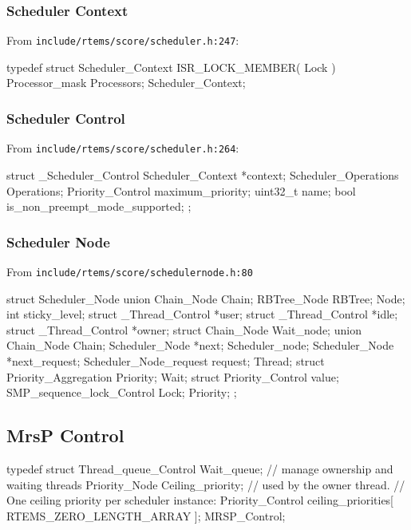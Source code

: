 \subsubsection{Scheduler Context}

From \texttt{include/rtems/score/scheduler.h:247}:
\begin{nicec}
typedef struct Scheduler_Context {
  ISR_LOCK_MEMBER( Lock )
  Processor_mask Processors;
} Scheduler_Context;
\end{nicec}

\subsubsection{Scheduler Control}

From \texttt{include/rtems/score/scheduler.h:264}:
\begin{nicec}
struct _Scheduler_Control {
  Scheduler_Context *context;
  Scheduler_Operations Operations;
  Priority_Control maximum_priority;
  uint32_t name;
  bool is_non_preempt_mode_supported;
};
\end{nicec}

\subsubsection{Scheduler Node}

From \texttt{include/rtems/score/schedulernode.h:80}
\begin{nicec}
struct Scheduler_Node {
  union {
    Chain_Node Chain;
    RBTree_Node RBTree;
  } Node;
  int sticky_level;
  struct _Thread_Control *user;
  struct _Thread_Control *idle;
  struct _Thread_Control *owner;
  struct {
    Chain_Node Wait_node;
    union {
      Chain_Node Chain;
      Scheduler_Node *next;
    } Scheduler_node;
    Scheduler_Node *next_request;
    Scheduler_Node_request request;
  } Thread;
  struct {
    Priority_Aggregation Priority;
  } Wait;
  struct {
    Priority_Control value;
    SMP_sequence_lock_Control Lock;
  } Priority;
};
\end{nicec}



\newpage
\subsection{MrsP Control}

\begin{nicec}
typedef struct {
  Thread_queue_Control Wait_queue; // manage ownership and waiting threads
  Priority_Node Ceiling_priority;  // used by the owner thread.
  // One ceiling priority per scheduler instance:
  Priority_Control ceiling_priorities[ RTEMS_ZERO_LENGTH_ARRAY ];
} MRSP_Control;
\end{nicec}

